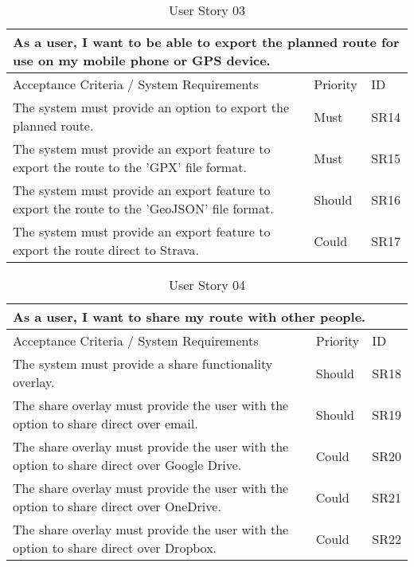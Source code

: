 \begin{table}[!htb]
\caption{User Story 03}
\label{tab:user-story-03}
\begin{tabular}{ p{11cm} p{1cm}  p{1cm} }
\hline
\multicolumn{3}{p{13cm}}{As a user, I want to be able to export the planned route for use on my mobile phone or GPS device.}\\ 
\hline
Acceptance Criteria / System Requirements & Priority & ID\\
\hline
The system must provide an option to export the planned route. & Must & SR14 \\
The system must provide an export feature to export the route to the 'GPX' file format. & Must & SR15\\
The system must provide an export feature to export the route to the 'GeoJSON' file format. & Should & SR16\\ 
The system must provide an export feature to export the route direct to Strava. & Could & SR17\\ 
\hline
\end{tabular}
\end{table}

\begin{table}[!htb]
\caption{User Story 04}
\label{tab:user-story-04}
\begin{tabular}{ p{11cm} p{1cm}  p{1cm} }
\hline
\multicolumn{3}{p{13cm}}{As a user, I want to share my route with other people.}\\ 
\hline
Acceptance Criteria / System Requirements & Priority & ID\\
\hline
The system must provide a share functionality overlay. & Should & SR18 \\
The share overlay must provide the user with the option to share direct over email. & Should & SR19\\
The share overlay must provide the user with the option to share direct over Google Drive. & Could & SR20\\ 
The share overlay must provide the user with the option to share direct over OneDrive. & Could & SR21\\ 
The share overlay must provide the user with the option to share direct over Dropbox. & Could & SR22\\ 
\hline
\end{tabular}
\end{table}

